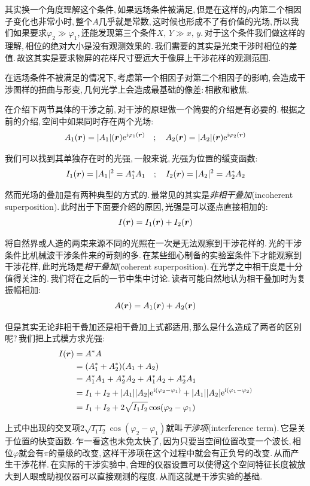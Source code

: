 其实换一个角度理解这个条件,\,如果远场条件被满足,\,但是在这样的$\rho$内第二个相因子变化也非常小时,\,整个$A$几乎就是常数,\,这时候也形成不了有价值的光场,\,所以我们如果要求$\varphi_2\gg \varphi_1$,\,还能发现第三个条件$X,\,Y\gg x,\,y$.\,对于这个条件我们做这样的理解,\,相位的绝对大小是没有观测效果的.\,我们需要的其实是光束干涉时相位的差值.\,故这其实是要求物屏的花样尺寸要远大于像屏上干涉花样的观测范围.

在远场条件不被满足的情况下,\,考虑第一个相因子对第二个相因子的影响,\,会造成干涉图样的扭曲与形变,\,几何光学上会造成最基础的像差:\,相散和散焦.

在介绍下两节具体的干涉之前,\,对干涉的原理做一个简要的介绍是有必要的.\,根据之前的介绍,\,空间中如果同时存在两个光场:
\[A_1(\boldsymbol{r})=|A_1|(\boldsymbol{r}){\rm e}^{{\rm i}\varphi_1(\boldsymbol{r})}\quad ;\quad A_2(\boldsymbol{r})=|A_2|(\boldsymbol{r}){\rm e}^{{\rm i}\varphi_2(\boldsymbol{r})}\]

我们可以找到其单独存在时的光强,\,一般来说,\,光强为位置的缓变函数:
\[I_1(\boldsymbol{r})=|A_1|^2=A_1^\ast A_1 \quad ;\quad I_2(\boldsymbol{r})=|A_2|^2=A_2^\ast A_2\]

然而光场的叠加是有两种典型的方式的.\,最常见的其实是\emph{非相干叠加}(incoherent superposition).\,此时出于下面要介绍的原因,\,光强是可以逐点直接相加的:
\[I(\boldsymbol{r})=I_1(\boldsymbol{r})+I_2(\boldsymbol{r})\]

将自然界或人造的两束来源不同的光照在一次是无法观察到干涉花样的.\,光的干涉条件比机械波干涉条件来的苛刻的多.\,在某些细心制备的实验室条件下才能观察到干涉花样,\,此时光场是\emph{相干叠加}(coherent superposition).\,在光学之中相干度是十分值得关注的.\,我们将在之后的一节中集中讨论.\,读者可能自然地认为相干叠加时为复振幅相加:
\[A(\boldsymbol{r})=A_1(\boldsymbol{r})+A_2(\boldsymbol{r})\]

但是其实无论非相干叠加还是相干叠加上式都适用,\,那么是什么造成了两者的区别呢?\,我们把上式模方求光强:
\begin{align*}
I(\boldsymbol{r}) &=A^\ast A \\
		  &=(A_1^\ast +A_2^\ast)(A_1+A_2) \\
		  &=A_1^\ast A_1+A_2^\ast A_2+ A_1^\ast A_2+A_2^\ast A_1 \\
		  &=I_1+I_2+ |A_1||A_2|{\rm e}^{{\rm i} (\varphi_2-\varphi_1)}+|A_1||A_2|{\rm e}^{{\rm i} (\varphi_1-\varphi_2)} \\
		  &=I_1+I_2+ 2\sqrt{I_1I_2}\cos (\varphi_2-\varphi_1)
\end{align*}

上式中出现的交叉项$2\sqrt{I_1I_2}\cos (\varphi_2-\varphi_1)$就叫\emph{干涉项}(interference term).\,它是关于位置的快变函数.\,乍一看这也未免太快了,\,因为只要当空间位置改变一个波长,\,相位$\varphi$就会有$\pi$的量级的改变,\,这样干涉项在这个过程中就会有正负号的改变.\,从而产生干涉花样.\,在实际的干涉实验中,\,合理的仪器设置可以使得这个空间特征长度被放大到人眼或助视仪器可以直接观测的程度.\,从而这就是干涉实验的基础.

